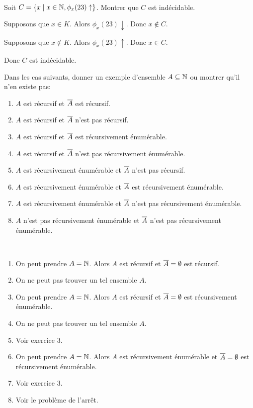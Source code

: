 \documentclass[french,a4paper,10pt]{article}
\begin{document}
    \begin{td-exo}\,\\
        Soit $C=\{x\mid x\in \mathbb{N},\phi_x(23)\uparrow\}$.
        Montrer que $C$ est indécidable.
    \end{td-exo}

    \begin{td-sol}
        Supposons que $x\in K$. Alors $\phi_x(23)\downarrow$. Donc $x\notin C$.

        Supposons que $x\notin K$. Alors $\phi_x(23)\uparrow$. Donc $x\in C$.

        Donc $C$ est indécidable.
    \end{td-sol}

    \begin{td-exo}[8]
        Dans les cas suivants, donner un exemple d'ensemble $A\subseteq \mathbb{N}$ ou montrer qu'il n'en existe pas:
        \begin{enumerate}
            \item $A$ est récursif et $\overline{A}$ est récursif.
            \item $A$ est récursif et $\overline{A}$ n'est pas récursif.
            \item $A$ est récursif et $\overline{A}$ est récursivement énumérable.
            \item $A$ est récursif et $\overline{A}$ n'est pas récursivement énumérable.
            \item $A$ est récursivement énumérable et $\overline{A}$ n'est pas récursif.
            \item $A$ est récursivement énumérable et $\overline{A}$ est récursivement énumérable.
            \item $A$ est récursivement énumérable et $\overline{A}$ n'est pas récursivement énumérable.
            \item $A$ n'est pas récursivement énumérable et $\overline{A}$ n'est pas récursivement énumérable.
        \end{enumerate}
    \end{td-exo}

    \begin{td-sol}\,
        \begin{enumerate}
            \item On peut prendre $A=\mathbb{N}$. Alors $A$ est récursif et $\overline{A}=\emptyset$ est récursif.
            \item On ne peut pas trouver un tel ensemble $A$.
            \item On peut prendre $A=\mathbb{N}$. Alors $A$ est récursif et $\overline{A}=\emptyset$ est récursivement énumérable.
            \item On ne peut pas trouver un tel ensemble $A$.
            \item Voir exercice 3.
            \item On peut prendre $A=\mathbb{N}$. Alors $A$ est récursivement énumérable et $\overline{A}=\emptyset$ est récursivement énumérable.
            \item Voir exercice 3.
            \item Voir le problème de l'arrêt.
        \end{enumerate}
    \end{td-sol}
\end{document}
